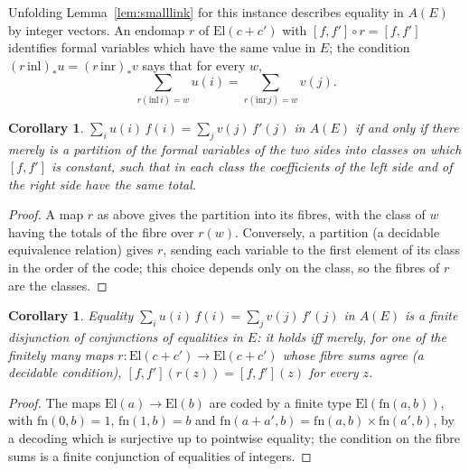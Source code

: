 \documentclass[11pt]{amsart}
\newtheorem{corollary}[theorem]{Corollary}
\theoremstyle{definition}
\theoremstyle{remark}
\newcommand{\El}{\mathrm{El}}
\begin{document}
Unfolding Lemma~\ref{lem:smalllink} for this instance describes equality
in $A(E)$ by integer vectors. An endomap $r$ of $\El(c+c')$ with
$[f,f']\circ r=[f,f']$ identifies formal variables which have the same
value in $E$; the condition $(r\,\mathrm{inl})_*u=(r\,\mathrm{inr})_*v$ says
that for every $w$,
\[
\sum_{r(\mathrm{inl}\,i)=w}u(i)=\sum_{r(\mathrm{inr}\,j)=w}v(j).
\]

\begin{corollary}\label{cor:abeq}
$\sum_i u(i)\,f(i)=\sum_j v(j)\,f'(j)$ in $A(E)$ if and only if there
merely is a partition of the formal variables of the two sides into
classes on which $[f,f']$ is constant, such that in each class the
coefficients of the left side and of the right side have the same total.
\end{corollary}
\begin{proof}
A map $r$ as above gives the partition into its fibres, with the class
of $w$ having the totals of the fibre over $r(w)$. Conversely, a partition
(a decidable equivalence relation) gives $r$, sending each variable to the
first element of its class in the order of the code; this choice depends
only on the class, so the fibres of $r$ are the classes.
\end{proof}

\begin{corollary}\label{cor:abfinite}
Equality $\sum_i u(i)\,f(i)=\sum_j v(j)\,f'(j)$ in $A(E)$ is a finite
disjunction of conjunctions of equalities in $E$: it holds iff merely, for
one of the finitely many maps $r:\El(c+c')\to\El(c+c')$ whose fibre sums
agree (a decidable condition), $[f,f'](r(z))=[f,f'](z)$ for every $z$.
\end{corollary}
\begin{proof}
The maps $\El(a)\to\El(b)$ are coded by a finite type $\El(\mathrm{fn}(a,b))$,
with $\mathrm{fn}(0,b)=1$, $\mathrm{fn}(1,b)=b$ and
$\mathrm{fn}(a+a',b)=\mathrm{fn}(a,b)\times\mathrm{fn}(a',b)$, by a
decoding which is surjective up to pointwise equality; the condition on
the fibre sums is a finite conjunction of equalities of integers.
\end{proof}
\end{document}
